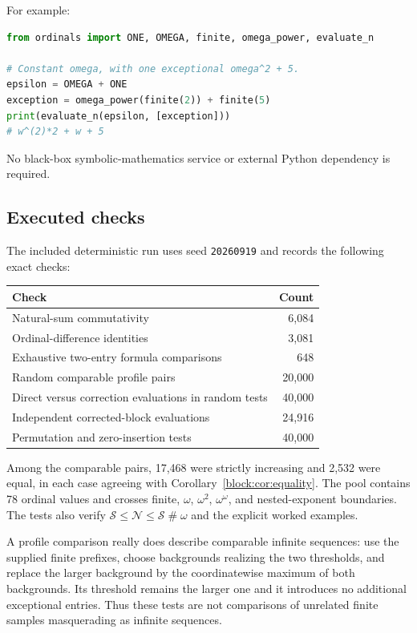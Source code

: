 \documentclass[11pt,a4paper]{article}
\theoremstyle{definition}
\newcommand{\ns}{\mathbin{\#}}
\newcommand{\OpN}{\mathcal N}
\newcommand{\OpS}{\mathcal S}
\begin{document}
For example:
\begin{lstlisting}[language=Python]
from ordinals import ONE, OMEGA, finite, omega_power, evaluate_n

# Constant omega, with one exceptional omega^2 + 5.
epsilon = OMEGA + ONE
exception = omega_power(finite(2)) + finite(5)
print(evaluate_n(epsilon, [exception]))
# w^(2)*2 + w + 5
\end{lstlisting}

No black-box symbolic-mathematics service or external Python dependency is required.

\subsection{Executed checks}

The included deterministic run uses seed \texttt{20260919} and records the following exact checks:
\begin{center}\small
\begin{tabular}{@{}lr@{}}
\toprule
Check & Count \\
\midrule
Natural-sum commutativity & 6,084 \\
Ordinal-difference identities & 3,081 \\
Exhaustive two-entry formula comparisons & 648 \\
Random comparable profile pairs & 20,000 \\
Direct versus correction evaluations in random tests & 40,000 \\
Independent corrected-block evaluations & 24,916 \\
Permutation and zero-insertion tests & 40,000 \\
\bottomrule
\end{tabular}
\end{center}

Among the comparable pairs, 17,468 were strictly increasing and 2,532 were equal, in each case agreeing with Corollary~\ref{block:cor:equality}. The pool contains 78 ordinal values and crosses finite, $\omega$, $\omega^2$, $\omega^\omega$, and nested-exponent boundaries. The tests also verify $\OpS\le\OpN\le\OpS\ns\omega$ and the explicit worked examples.

A profile comparison really does describe comparable infinite sequences: use the supplied finite prefixes, choose backgrounds realizing the two thresholds, and replace the larger background by the coordinatewise maximum of both backgrounds. Its threshold remains the larger one and it introduces no additional exceptional entries. Thus these tests are not comparisons of unrelated finite samples masquerading as infinite sequences.
\end{document}
